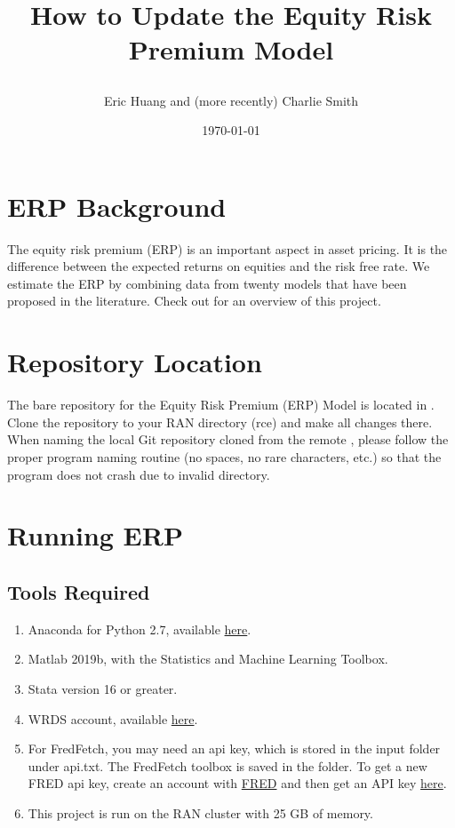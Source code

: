 \documentclass{article}
\begin{document}
	
	\title{How to Update the Equity Risk Premium Model
		\author{Eric Huang and (more recently) Charlie Smith}
		\date{\today}
	}
	
	\maketitle
	
	\section{ERP Background}
	
	The equity risk premium (ERP) is an important aspect in asset pricing. It is the difference between the expected returns on equities and the risk free rate. We estimate the ERP by combining data from twenty models that have been proposed in the literature. Check out  for an overview of this project. 
	
	\section{Repository Location}
	
	The bare repository for the Equity Risk Premium (ERP) Model is
	located in . Clone the repository to your RAN directory (rce) and make all changes there. When naming the local Git repository cloned from the remote , please follow the proper program naming routine (no spaces, no rare characters, etc.) so that the
	program does not crash due to invalid directory.
	
	\section{Running ERP}
	\subsection{Tools Required}
	\begin{enumerate}
		\item Anaconda for Python 2.7, available \href{https://www.continuum.io/downloads}{here}.
		\item Matlab 2019b, with the Statistics and Machine Learning Toolbox.
		\item Stata version 16 or greater. 
		\item WRDS account, available \href{https://wrds-web.wharton.upenn.edu/wrds/}{here}.
		\item For FredFetch, you may need an api key, which is stored in the input folder under api.txt. The FredFetch toolbox is saved in the  folder. To get a new FRED api key, create an account with \href{https://fred.stlouisfed.org/}{FRED} and then get an API key \href{https://research.stlouisfed.org/docs/api/api_key.html}{here}.
		\item This project is run on the RAN cluster with 25 GB of memory. 
	\end{enumerate}
	
\end{document}

